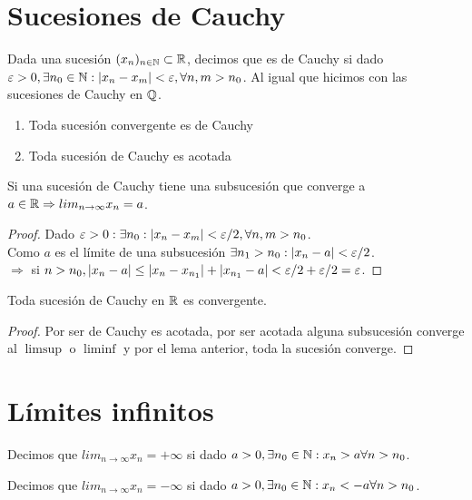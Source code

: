 \section{Sucesiones de Cauchy}

Dada una sucesión $(x_n)_{n \in \mathbb{N}} \subset \mathbb{R}$, decimos que es de Cauchy si dado $\varepsilon > 0, \exists n_0 \in \mathbb{N} : |x_n - x_m| < \varepsilon, \forall n,m > n_0$. Al igual que hicimos con las sucesiones de Cauchy en $\mathbb{Q}$.

\begin{enumerate}
  \item Toda sucesión convergente es de Cauchy 
  \item Toda sucesión de Cauchy es acotada
\end{enumerate}

\begin{lemma}
  Si una sucesión de Cauchy tiene una subsucesión que converge a $a \in \mathbb{R} \Rightarrow lim_{n \to \infty} x_n = a$.
  \begin{proof}
    Dado $\varepsilon > 0 : \exists n_0 : |x_n - x_m| < \varepsilon / 2, \forall n,m > n_0$. \\
    Como $a$ es el límite de una subsucesión $\exists n_1 > n_0 : |x_n - a| < \varepsilon / 2$. \\
    $\Rightarrow$ si $n > n_0, |x_n - a| \leq |x_n - x_{n_1}| + |x_{n_1} - a| < \varepsilon / 2 + \varepsilon / 2 = \varepsilon$. 
  \end{proof}
\end{lemma}

\begin{theorem}
  Toda sucesión de Cauchy en $\mathbb{R}$ es convergente.
  \begin{proof}
    Por ser de Cauchy es acotada, por ser acotada alguna subsucesión converge al $\limsup$ o $\liminf$ y por el lema anterior, toda la sucesión converge.
  \end{proof}
\end{theorem}

\section{Límites infinitos}

\begin{definition}
  Decimos que $lim_{n \to \infty} x_n = + \infty$ si dado $a > 0, \exists n_0 \in \mathbb{N} : x_n > a \forall n > n_0$.
\end{definition}

\begin{definition}
  Decimos que $lim_{n \to \infty} x_n = - \infty$ si dado $a > 0, \exists n_0 \in \mathbb{N} : x_n < -a \forall n > n_0$.
\end{definition}


